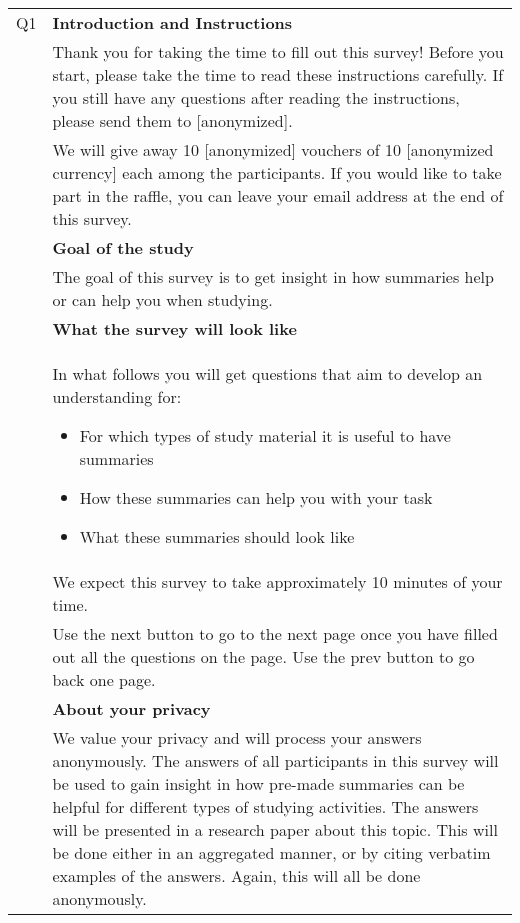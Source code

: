 \begin{xtabular}{@{\,}l <{\hskip 2pt} >{\raggedright\arraybackslash}p{0.82\textwidth}}

    Q1  & \textbf{Introduction and Instructions} \\

        & Thank you for taking the time to fill out this survey! Before you start, please take the time to read these instructions carefully. If you still have any questions after reading the instructions, please send them to [anonymized]. \\
        & We will give away 10 [anonymized] vouchers of 10 [anonymized currency] each among the participants. If you would like to take part in the raffle, you can leave your email address at the end of this survey. \\

        & \textbf{Goal of the study} \\

        & The goal of this survey is to get insight in how summaries help or can help you when studying. \\

        & \textbf{What the survey will look like} \\

        & In what follows you will get questions that aim to develop an understanding for:
        \begin{itemize}[leftmargin=*]
          \item For which types of study material it is useful to have summaries
          \item How these summaries can help you with your task
          \item What these summaries should look like
        \end{itemize} \\

        & We expect this survey to take approximately 10 minutes of your time. \\

        &  Use the next button to go to the next page once you have filled out all the questions on the page. Use the prev button to go back one page. \\

        & \textbf{About your privacy} \\

        & We value your privacy and will process your answers anonymously. The answers of all participants in this survey will be used to gain insight in how pre-made summaries can be helpful for different types of studying activities. The answers will be presented in a research paper about this topic. This will be done either in an aggregated manner, or by citing verbatim examples of the answers. Again, this will all be done anonymously. \\


\end{xtabular}
